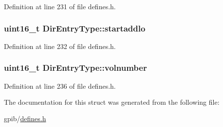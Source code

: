Definition at line 231 of file defines.\+h.

\subsubsection[{\texorpdfstring{startaddlo}{startaddlo}}]{\setlength{\rightskip}{0pt plus 5cm}uint16\+\_\+t Dir\+Entry\+Type\+::startaddlo}\hypertarget{structDirEntryType_aea0e798bb172b4bddf174ce339a4a54a}{}\label{structDirEntryType_aea0e798bb172b4bddf174ce339a4a54a}


Definition at line 232 of file defines.\+h.

\subsubsection[{\texorpdfstring{volnumber}{volnumber}}]{\setlength{\rightskip}{0pt plus 5cm}uint16\+\_\+t Dir\+Entry\+Type\+::volnumber}\hypertarget{structDirEntryType_add9ab11f89586efb100471f6580e75c5}{}\label{structDirEntryType_add9ab11f89586efb100471f6580e75c5}


Definition at line 236 of file defines.\+h.



The documentation for this struct was generated from the following file\+:\begin{DoxyCompactItemize}
\item 
gpib/\hyperlink{defines_8h}{defines.\+h}\end{DoxyCompactItemize}
